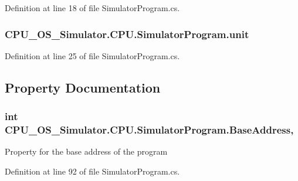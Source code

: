 Definition at line 18 of file Simulator\+Program.\+cs.

\hypertarget{class_c_p_u___o_s___simulator_1_1_c_p_u_1_1_simulator_program_a10e4c29c3ed9b84c0fb8aee7613cabf9}{}
\subsubsection[{unit}]{ C\+P\+U\+\_\+\+O\+S\+\_\+\+Simulator.\+C\+P\+U.\+Simulator\+Program.\+unit\hspace{0.3cm}{\ttfamily [private]}}\label{class_c_p_u___o_s___simulator_1_1_c_p_u_1_1_simulator_program_a10e4c29c3ed9b84c0fb8aee7613cabf9}


Definition at line 25 of file Simulator\+Program.\+cs.



\subsection{Property Documentation}
\hypertarget{class_c_p_u___o_s___simulator_1_1_c_p_u_1_1_simulator_program_ad07bee447d47fb07243a4484b5740c21}{}
\subsubsection[{Base\+Address}]{\setlength{\rightskip}{0pt plus 5cm}int C\+P\+U\+\_\+\+O\+S\+\_\+\+Simulator.\+C\+P\+U.\+Simulator\+Program.\+Base\+Address\hspace{0.3cm}{\ttfamily [get]}, {\ttfamily [set]}}\label{class_c_p_u___o_s___simulator_1_1_c_p_u_1_1_simulator_program_ad07bee447d47fb07243a4484b5740c21}


Property for the base address of the program 



Definition at line 92 of file Simulator\+Program.\+cs.

